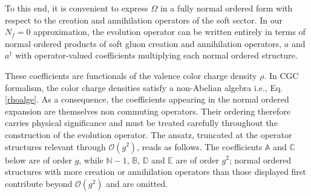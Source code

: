 \documentclass[a4paper,11pt]{article}
\def\mf#1{\mathbb{#1}}
\begin{document}
To this end, it is convenient to express $\Omega$ in a fully normal ordered form with respect to the creation and annihilation operators of the soft sector. In our $N_{f} = 0$ approximation, the evolution operator can be written entirely in terms of normal ordered products of soft gluon creation and annihilation operators, $a$ and $a^{\dagger}$ with operator-valued coefficients multiplying each normal ordered structure.

    These coefficients are functionals of the valence color charge density $\rho$. In CGC formalism, the color charge densities satisfy a non-Abelian algebra i.e., Eq. \eqref{rhoalge}. As a consequence, the coefficients appearing in the normal ordered expansion are themselves non commuting operators. Their ordering therefore carries physical significance and must be treated carefully throughout the construction of the evolution operator. The ansatz, truncated at the operator structures relevant through $\mathcal{O}(g^{2})$, reads as follows. The coefficients $\mf{A}$ and $\mf{C}$ below are of order $g$, while $\mf{N}-1$, $\mf{B}$, $\mf{D}$ and $\mf{E}$ are of order $g^{2}$; normal ordered structures with more creation or annihilation operators than those displayed first contribute beyond $\mathcal{O}(g^{2})$ and are omitted.
\end{document}
